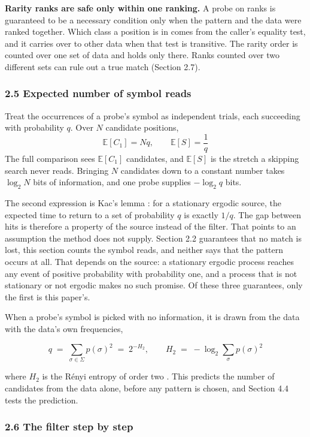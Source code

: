 \noindent\textbf{Rarity ranks are safe only within one ranking.} A probe on ranks is guaranteed to be a necessary condition only when the pattern and the data were ranked together. Which class a position is in comes from the caller's equality test, and it carries over to other data when that test is transitive. The rarity order is counted over one set of data and holds only there. Ranks counted over two different sets can rule out a true match (Section 2.7).

\subsubsection{2.5 Expected number of symbol reads}

Treat the occurrences of a probe's symbol as independent trials, each succeeding with probability \(q\). Over \(N\) candidate positions,
\[
  \mathbb{E}[C_1] = N q, \qquad \mathbb{E}[S] = \frac{1}{q}
\]
The full comparison sees \(\mathbb{E}[C_1]\) candidates, and \(\mathbb{E}[S]\) is the stretch a skipping search never reads. Bringing \(N\) candidates down to a constant number takes \(\log_2 N\) bits of information, and one probe supplies \(-\log_2 q\) bits.

The second expression is Kac's lemma \cite{src:Kac}: for a stationary ergodic source, the expected time to return to a set of probability \(q\) is exactly \(1/q\). The gap between hits is therefore a property of the source instead of the filter. That points to an assumption the method does not supply. Section 2.2 guarantees that no match is lost, this section counts the symbol reads, and neither says that the pattern occurs at all. That depends on the source: a stationary ergodic process reaches any event of positive probability with probability one, and a process that is not stationary or not ergodic makes no such promise. Of these three guarantees, only the first is this paper's.

When a probe's symbol is picked with no information, it is drawn from the data with the data's own frequencies,

\[
q \;=\; \sum_{\sigma \in \Sigma} p(\sigma)^2 \;=\; 2^{-H_2}, \qquad
H_2 \;=\; -\log_2 \sum_{\sigma} p(\sigma)^2
\]

where \(H_2\) is the R\'enyi entropy of order two \cite{src:Renyi}. This predicts the number of candidates from the data alone, before any pattern is chosen, and Section 4.4 tests the prediction.

\subsubsection{2.6 The filter step by step}

